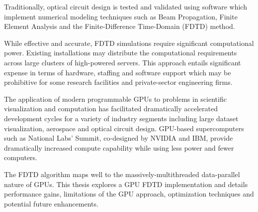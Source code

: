 Traditionally, optical circuit design is tested and validated using software which implement numerical modeling techniques such as Beam Propagation, Finite Element Analysis and the Finite-Difference Time-Domain (FDTD) method.

While effective and accurate, FDTD simulations require significant computational power. Existing installations may distribute the computational requirements across large clusters of high-powered servers. This approach entails significant expense in terms of hardware, staffing and software support which may be prohibitive for some research facilities and private-sector engineering firms.

The application of modern programmable GPUs to problems in scientific visualization and computation has facilitated dramatically accelerated development cycles for a variety of industry segments including large dataset visualization\cite{raycasting}, aerospace\cite{Strzodka2013381} and optical circuit design. GPU-based supercomputers such as National Labs' Summit\cite{nvidiaNationalLabs}, co-designed by NVIDIA and IBM, provide dramatically increased compute capability while using less power and fewer computers. 

The FDTD algorithm maps well to the massively-multithreaded data-parallel nature of GPUs. This thesis explores a GPU FDTD implementation and details performance gains, limitations of the GPU approach, optimization techniques and potential future enhancements. 